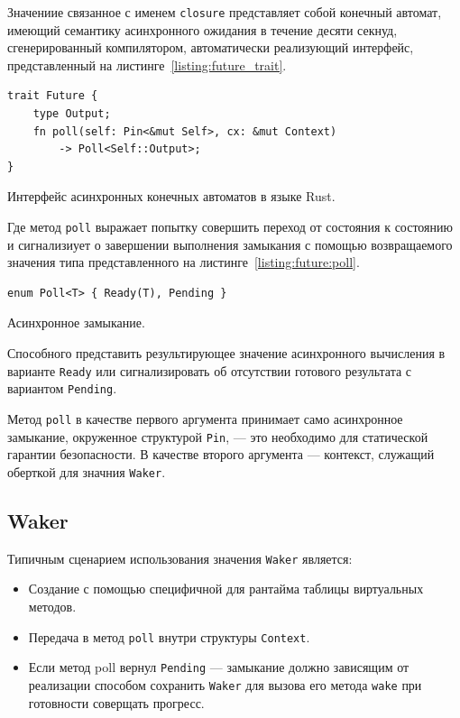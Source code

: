 Значениие связанное с именем \verb|closure| представляет собой конечный автомат, имеющий семантику асинхронного ожидания в течение десяти секнуд, сгенерированный компилятором, автоматически реализующий интерфейс, представленный на листинге~\ref{listing:future_trait}.

\begin{listing}[H]
    \begin{verbatim}
trait Future {
    type Output;
    fn poll(self: Pin<&mut Self>, cx: &mut Context)
        -> Poll<Self::Output>;
}
    \end{verbatim}

    \caption{Интерфейс асинхронных конечных автоматов в языке Rust.}
    \label{listing:future_trait}
\end{listing}

Где метод \verb|poll| выражает попытку совершить переход от состояния к состоянию и сигнализиует о завершении выполнения замыкания с помощью возвращаемого значения типа представленного на листинге~\ref{listing:future:poll}.

\begin{listing}[H]
    \begin{verbatim}
enum Poll<T> { Ready(T), Pending }
    \end{verbatim}

    \caption{Асинхронное замыкание.}
    \label{listing:future:poll}
\end{listing}

Способного представить результирующее значение асинхронного вычисления в варианте \verb|Ready| или сигнализировать об отсутствии готового результата с вариантом \verb|Pending|.

Метод \verb|poll| в качестве первого аргумента принимает само асинхронное замыкание, окруженное структурой \verb|Pin|, --- это необходимо для статической гарантии безопасности. В качестве второго аргумента --- контекст, служащий оберткой для значния \verb|Waker|.

\subsection{Waker}

Типичным сценарием использования значения \verb|Waker| является:

\begin{itemize}
    \item Создание с помощью специфичной для рантайма таблицы виртуальных методов.
    \item Передача в метод \verb|poll| внутри структуры \verb|Context|.
    \item Если метод poll вернул \verb|Pending| --- замыкание должно зависящим от реализации способом сохранить \verb|Waker| для вызова его метода \verb|wake| при готовности соверщать прогресс.
\end{itemize}

